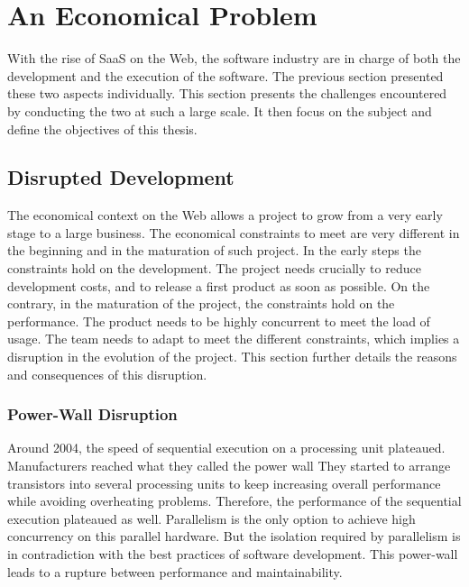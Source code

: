 \section{An Economical Problem} \label{chapter2:problem-statement}

With the rise of SaaS on the Web, the software industry are in charge of both the development and the execution of the software.
The previous section presented these two aspects individually.
This section presents the challenges encountered by conducting the two at such a large scale.
It then focus on the subject and define the objectives of this thesis.

\subsection{Disrupted Development}

The economical context on the Web allows a project to grow from a very early stage to a large business.
The economical constraints to meet are very different in the beginning and in the maturation of such project.
In the early steps the constraints hold on the development.
The project needs crucially to reduce development costs, and to release a first product as soon as possible.
On the contrary, in the maturation of the project, the constraints hold on the performance.
The product needs to be highly concurrent to meet the load of usage.
The team needs to adapt to meet the different constraints, which implies a disruption in the evolution of the project.
This section further details the reasons and consequences of this disruption.

\subsubsection{Power-Wall Disruption}


Around 2004, the speed of sequential execution on a processing unit plateaued.
Manufacturers reached what they called the power wall
They started to arrange transistors into several processing units to keep increasing overall performance while avoiding overheating problems.
Therefore, the performance of the sequential execution plateaued as well.
Parallelism is the only option to achieve high concurrency on this parallel hardware.
But the isolation required by parallelism is in contradiction with the best practices of software development.
This power-wall leads to a rupture between performance and maintainability.

